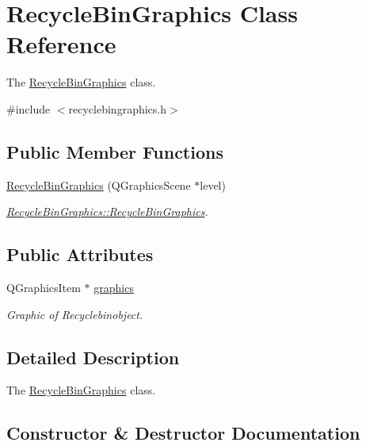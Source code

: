 \hypertarget{class_recycle_bin_graphics}{}\section{Recycle\+Bin\+Graphics Class Reference}
\label{class_recycle_bin_graphics}


The \hyperlink{class_recycle_bin_graphics}{Recycle\+Bin\+Graphics} class.  




{\ttfamily \#include $<$recyclebingraphics.\+h$>$}

\subsection*{Public Member Functions}
\begin{DoxyCompactItemize}
\item 
\hyperlink{class_recycle_bin_graphics_afe8714eec166ad6a723d382f60beaa74}{Recycle\+Bin\+Graphics} (Q\+Graphics\+Scene $\ast$level)
\begin{DoxyCompactList}\small\item\em \hyperlink{class_recycle_bin_graphics_afe8714eec166ad6a723d382f60beaa74}{Recycle\+Bin\+Graphics\+::\+Recycle\+Bin\+Graphics}. \end{DoxyCompactList}\end{DoxyCompactItemize}
\subsection*{Public Attributes}
\begin{DoxyCompactItemize}
\item 
Q\+Graphics\+Item $\ast$ \hyperlink{class_recycle_bin_graphics_af2e892576d357f795b21027c55557570}{graphics}
\begin{DoxyCompactList}\small\item\em Graphic of Recyclebinobject. \end{DoxyCompactList}\end{DoxyCompactItemize}


\subsection{Detailed Description}
The \hyperlink{class_recycle_bin_graphics}{Recycle\+Bin\+Graphics} class. 

\subsection{Constructor \& Destructor Documentation}
